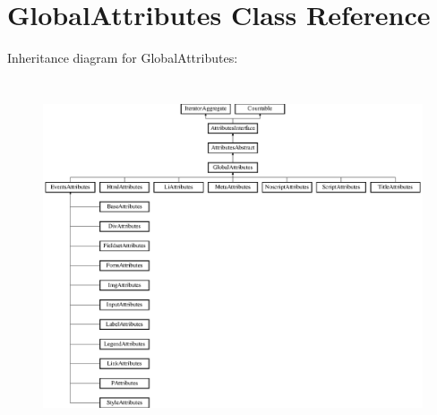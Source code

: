 \hypertarget{class_pes_1_1_dom_1_1_node_1_1_attributes_1_1_global_attributes}{}\section{Global\+Attributes Class Reference}
\label{class_pes_1_1_dom_1_1_node_1_1_attributes_1_1_global_attributes}
Inheritance diagram for Global\+Attributes\+:\begin{figure}[H]
\begin{center}
\leavevmode
\includegraphics[height=10.406505cm]{class_pes_1_1_dom_1_1_node_1_1_attributes_1_1_global_attributes}
\end{center}
\end{figure}
